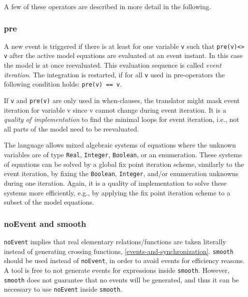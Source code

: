 A few of these operators are described in more detail in the following.

\subsubsection{pre}\label{pre}

A new event is triggered if there is at least for one variable \lstinline!v! such that \lstinline!pre(v)<> v! after the active model equations are
evaluated at an event instant. In this case the model is at once
reevaluated. This evaluation sequence is called \emph{event
iteration}. The integration is restarted, if for all \lstinline!v! used in
pre-operators the following condition holds: \lstinline!pre(v) == v!.

\begin{nonnormative}
If \lstinline!v! and \lstinline!pre(v)! are only used in when-clauses,
the translator might mask event iteration for variable v since v cannot
change during event iteration. It is a \emph{quality of implementation} to
find the minimal loops for event iteration, i.e., not all parts of the
model need to be reevaluated.

The language allows mixed algebraic systems of equations where the
unknown variables are of type \lstinline!Real!, \lstinline!Integer!, \lstinline!Boolean!, or an enumeration.
These systems of equations can be solved by a global fix point iteration
scheme, similarly to the event iteration, by fixing the \lstinline!Boolean!,
\lstinline!Integer!, and/or enumeration unknowns during one iteration. Again, it is
a quality of implementation to solve these systems more efficiently,
e.g., by applying the fix point iteration scheme to a subset of the
model equations.
\end{nonnormative}

\subsubsection{noEvent and smooth}\label{noevent-and-smooth}

\lstinline!noEvent! implies that real elementary relations/functions
are taken literally instead of generating crossing functions, \cref{events-and-synchronization}.
\lstinline!smooth! should be used instead of \lstinline!noEvent!, in order to
avoid events for efficiency reasons. A tool is free to not generate
events for expressions inside \lstinline!smooth!. However, \lstinline!smooth! does not guarantee
that no events will be generated, and thus it can be necessary to use
\lstinline!noEvent! inside \lstinline!smooth!.

